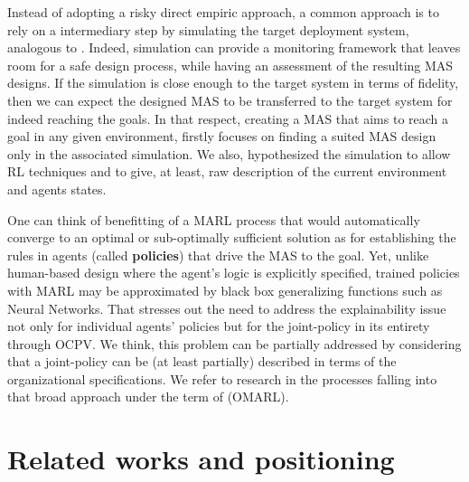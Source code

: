 \documentclass[runningheads]{llncs}
\begin{document}
Instead of adopting a risky direct empiric approach, a common approach is to rely on a intermediary step by simulating the target deployment system, analogous to . Indeed, simulation can provide a monitoring framework that leaves room for a safe design process, while having an assessment of the resulting MAS designs. If the simulation is close enough to the target system in terms of fidelity, then we can expect the designed MAS to be transferred to the target system for indeed reaching the goals.
In that respect, creating a MAS that aims to reach a goal in any given environment, firstly focuses on finding a suited MAS design only in the associated simulation. We also, hypothesized the simulation to allow RL techniques and to give, at least, raw description of the current environment and agents states.

One can think of benefitting of a MARL process that would automatically converge to an optimal or sub-optimally sufficient solution as for establishing the rules in agents (called \textbf{policies}) that drive the MAS to the goal. Yet, unlike human-based design where the agent's logic is explicitly specified, trained policies with MARL may be approximated by black box generalizing functions such as Neural Networks. That stresses out the need to address the explainability issue not only for individual agents' policies but for the joint-policy in its entirety through OCPV. We think, this problem can be partially addressed by considering that a joint-policy can be (at least partially) described in terms of the organizational specifications. We refer to research in the processes falling into that broad approach under the term of  (OMARL).


\section{Related works and positioning}


\end{document}
